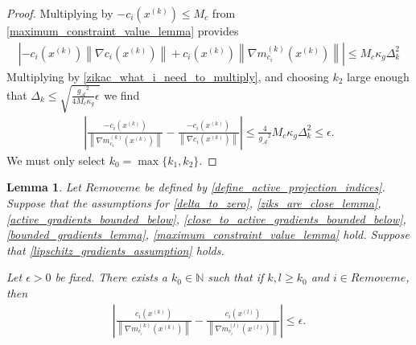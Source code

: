 \documentclass{article}
\newtheorem{lemma}[theorem]{Lemma}
\theoremstyle{case}
\numberwithin{theorem}{subsection}
\newcommand{\dk}{\Delta_k}
\newcommand{\gmcik}{{\nabla m_{c_i}^{(k)}\left(\xk\right)}}
\newcommand{\gmcil}{{\nabla m_{c_i}^{(l)}\left(\xl\right)}}
\newcommand{\minactivegrad}{{ g_{\mathcal A} }}
\newcommand{\naturals}{\mathbb N}
\newcommand{\xk}{x^{(k)}}
\newcommand{\xl}{{x^{(l)}}}
\newcommand{\activeprojk}{{Remove me}}
\begin{document}
\begin{proof}
Multiplying by $-c_i\left(\xk\right) \le M_c$ from \cref{maximum_constraint_value_lemma} provides
\begin{align*}
\left|-c_i\left(\xk\right)\left\|\nabla c_i\left(\xk \right)\right\| + c_i\left(\xk\right)\left\|\gmcik\right\|\right| \le M_c \kappa_g \dk^2
\end{align*}
Multiplying by \cref{zikac_what_i_need_to_multiply}, and choosing $k_2$ large enough that 
$\dk \le \sqrt{\frac{\minactivegrad^2}{4M_c \kappa_g} \epsilon}$
we find
\begin{align*}
\left|\frac{-c_i\left(\xk \right)}{\left\|\gmcik\right\|} 
- \frac{-c_i\left(\xk \right)}{\left\|\nabla c_i\left(\xk \right)\right\|} \right|
\le \frac4{\minactivegrad^2} M_c \kappa_g \dk^2
\le \epsilon.
\end{align*}
We must only select $k_0 = \max\{k_1, k_2\}$.
\end{proof}





\begin{lemma}
\label{forgot_where_i_am}
Let $\activeprojk$ be defined by \cref{define_active_projection_indices}.
Suppose that the assumptions for
\cref{delta_to_zero},
\cref{ziks_are_close_lemma},
\cref{active_gradients_bounded_below},
\cref{close_to_active_gradients_bounded_below},
\cref{bounded_gradients_lemma},
\cref{maximum_constraint_value_lemma}
hold.
Suppose that \cref{lipschitz_gradients_assumption} holds.





Let $\epsilon > 0$ be fixed.
There exists a $k_0 \in \naturals$ such that if $k, l \ge k_0$ and $i \in \activeprojk$, then
\begin{align*}
\left|
\frac{c_i\left(\xk\right)}{\left\|\gmcik\right\|} - \frac{c_i\left(\xl\right)}{\left\|\gmcil\right\|} 
\right| \le \epsilon.
\end{align*}
\end{lemma}
\end{document}
